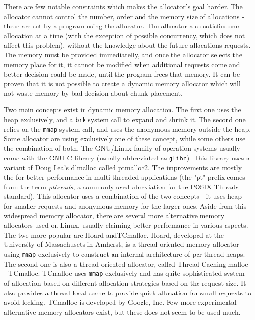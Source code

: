 There are few notable constraints which makes the allocator's goal harder. The allocator cannot control the number, order and the memory size of allocations - these are set by a program using the allocator. The allocator also satisfies one allocation at a time (with the exception of possible concurrency, which does not affect this problem), without the knowledge about the future allocations requests. The memory must be provided immediatelly, and once the allocator selects the memory place for it, it cannot be modified when additional requests come and better decision could be made, until the program frees that memory. It can be proven that it is not possible to create a dynamic memory allocator which will not waste memory by bad decision about chunk placement.\cite{DSAsurvey}

Two main concepts exist in dynamic memory allocation. The first one uses the heap exclusively, and a {\tt brk} system call to expand and shrink it. The second one relies on the {\tt mmap} system call, and uses the anonymous memory outside the heap. Some allocator are using exclusively one of these concept, while some others use the combination of both. The GNU/Linux family of operation systems usually come with the GNU C library (usually abbreviated as {\tt glibc}). This library uses a variant of Doug Lea's dlmalloc called ptmalloc2. The improvements are mostly the for better performance in multi-threaded applications (the "pt" prefix comes from the term {\em pthreads}, a commonly used abreviation for the POSIX Threads standard). This allocator uses a combination of the two concepts - it uses heap for smaller requests and anonymous memory for the larger ones. Aside from this widespread memory allocator, there are several more alternative memory allocators used on Linux, usually claiming better performance in various aspects. The two more popular are Hoard andTCmalloc. Hoard, developed at the University of Massachusets in Amherst, is a thread oriented memory allocator using {\tt mmap} exclusively to construct an internal architecture of per-thread heaps.\cite{allocators:hoard} The second one is also a thread oriented allocator, called Thread Caching malloc - TCmalloc. TCmalloc uses {\tt mmap} exclusively and has quite sophisticated system of allocation based on different allocation strategies based on the request size. It also provides a thread local cache to provide quick allocation for small requests to avoid locking.\cite{tcmalloc} TCmalloc is developed by Google, Inc. Few more experimental alternative memory allocators exist, but these does not seem to be used much.


